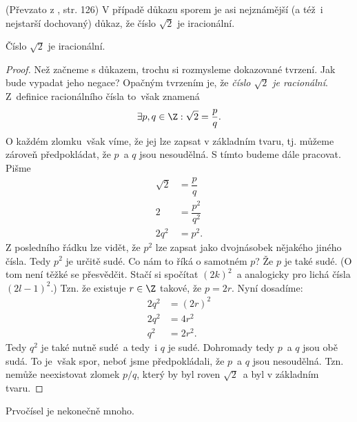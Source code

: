 (Převzato z \cite{ChartrandPolimeniZhang2014}, str. 126)
V případě důkazu sporem je asi nejznámější (a též~i nejstarší dochovaný) důkaz, že číslo $\sqrt{2}$ je iracionální.
\begin{proposition}
    Číslo $\sqrt{2}$ je iracionální.
\end{proposition}
\begin{proof}
    Než začneme s důkazem, trochu si rozmysleme dokazované tvrzení. Jak bude vypadat jeho negace? Opačným tvrzením je, že \emph{číslo $\sqrt{2}$ je racionální}. Z~definice racionálního čísla to~však znamená
    \begin{equation*}
        \exists p,q\in\Z : \sqrt{2}=\dfrac{p}{q}.
    \end{equation*}
    O každém zlomku~však víme, že jej lze zapsat v základním tvaru, tj. můžeme zároveň předpokládat, že $p$~a $q$ jsou nesoudělná. S tímto budeme dále pracovat. Pišme
    \begin{align*}
        \sqrt{2}&=\dfrac{p}{q}\\
        2&=\dfrac{p^2}{q^2}\\
        2q^2&=p^2.
    \end{align*}
    Z posledního řádku lze vidět, že $p^2$ lze zapsat jako dvojnásobek nějakého jiného čísla. Tedy $p^2$ je určitě sudé. Co nám to říká o samotném $p$? Že $p$ je také sudé. (O tom není těžké se přesvědčit. Stačí si spočítat $(2k)^2$~a analogicky pro lichá čísla $(2l-1)^2$.) Tzn. že existuje $r\in\Z$ takové, že $p=2r$. Nyní dosadíme:
    \begin{align*}
        2q^2&=(2r)^2\\
        2q^2&=4r^2\\
        q^2&=2r^2.
    \end{align*}
    Tedy $q^2$ je také nutně sudé~a tedy~i $q$ je sudé. Dohromady tedy $p$~a $q$ jsou obě sudá. To je~však spor, neboť jsme předpokládali, že $p$~a $q$ jsou nesoudělná. Tzn. nemůže neexistovat zlomek $p/q$, který by byl roven $\sqrt{2}$~a byl v základním tvaru.
\end{proof}
\begin{proposition}\label{prop:prvocisla}
    Prvočísel je nekonečně mnoho.
\end{proposition}
